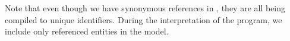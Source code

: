 
Note that even though we have synonymous references in \langname{}, they are all being compiled to unique identifiers.
During the interpretation of the program, we include only referenced entities in the model.






